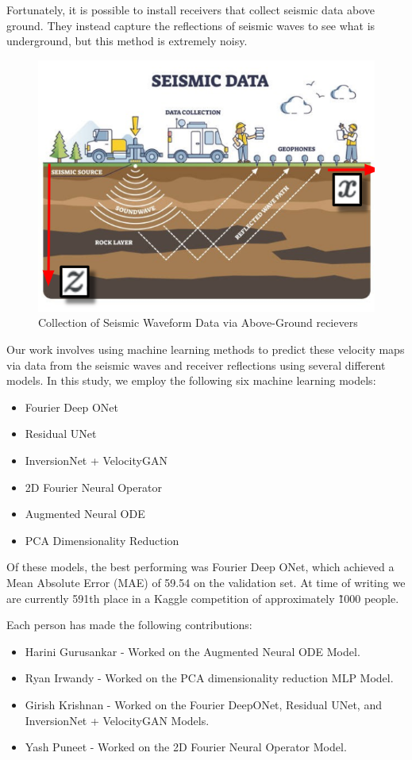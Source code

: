 \documentclass{article}
\begin{document}
    Fortunately, it is possible to install receivers that collect seismic data above ground. They instead capture the reflections of seismic waves to see what is underground, but this method is extremely noisy.   

    \begin{figure}[H]
        \centering
        \includegraphics[width=0.5\linewidth]{figures/intro1.png}
        \caption{Collection of Seismic Waveform Data via Above-Ground recievers }
        \label{fig:intro1}
    \end{figure}

    Our work involves using machine learning methods to predict these velocity maps via data from the seismic waves and receiver reflections using several different models. In this study, we employ the following six machine learning models: 

    \begin{itemize}
        \item Fourier Deep ONet
        \item Residual UNet 
        \item InversionNet + VelocityGAN 
        \item 2D Fourier Neural Operator
        \item Augmented Neural ODE 
        \item PCA Dimensionality Reduction
    \end{itemize}

    Of these models, the best performing was Fourier Deep ONet, which achieved a Mean Absolute Error (MAE) of 59.54 on the validation set. At time of writing we are currently 591th place in a Kaggle competition of approximately \~ 1000 people. 

    Each person has made the following contributions: 

    \begin{itemize}
        \item Harini Gurusankar - Worked on the Augmented Neural ODE Model.
        \item Ryan Irwandy - Worked on the PCA dimensionality reduction MLP Model. 
        \item Girish Krishnan - Worked on the Fourier DeepONet, Residual UNet, and InversionNet + VelocityGAN Models.
        \item Yash Puneet - Worked on the 2D Fourier Neural Operator Model.
    \end{itemize}
\end{document}
